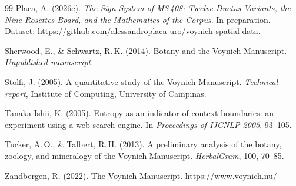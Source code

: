 \documentclass[11pt,a4paper]{article}
\begin{document}
\begin{thebibliography}{99}
Placa, A. (2026c).
\newblock \textit{The Sign System of MS\,408: Twelve Ductus Variants, the Nine-Rosettes Board, and the Mathematics of the Corpus}.
\newblock In preparation. Dataset: \url{https://github.com/alessandroplaca-uro/voynich-spatial-data}.

Sherwood, E., \& Schwartz, R.\,K. (2014).
\newblock Botany and the Voynich Manuscript.
\newblock \textit{Unpublished manuscript}.

Stolfi, J. (2005).
\newblock A quantitative study of the Voynich Manuscript.
\newblock \textit{Technical report}, Institute of Computing, University of Campinas.

Tanaka-Ishii, K. (2005).
\newblock Entropy as an indicator of context boundaries: an experiment using a web search engine.
\newblock In \textit{Proceedings of IJCNLP 2005}, 93--105.

Tucker, A.\,O., \& Talbert, R.\,H. (2013).
\newblock A preliminary analysis of the botany, zoology, and mineralogy of the Voynich Manuscript.
\newblock \textit{HerbalGram}, 100, 70--85.

Zandbergen, R. (2022).
\newblock The Voynich Manuscript.
\newblock \url{https://www.voynich.nu/}

\end{thebibliography}
\end{document}
